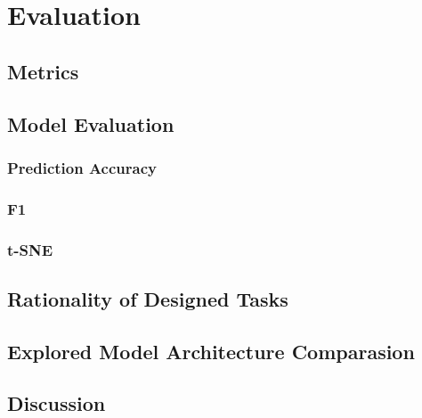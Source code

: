 \section{Evaluation}

\subsection{Metrics}

\subsection{Model Evaluation}

\subsubsection{Prediction Accuracy}

\subsubsection{F1}

\subsubsection{t-SNE}

\subsection{Rationality of Designed Tasks}


\subsection{Explored Model Architecture Comparasion}

\subsection{Discussion}


\cleardoublepage
